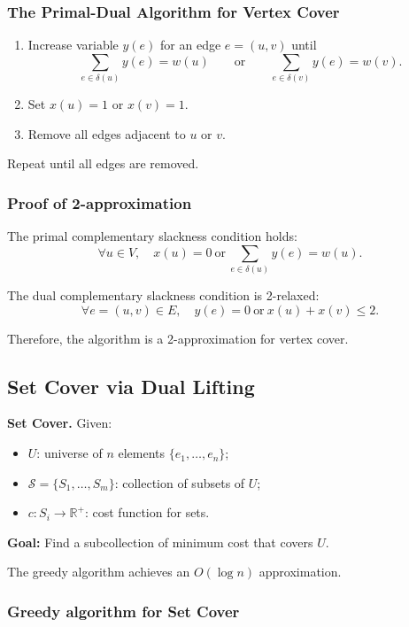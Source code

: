 \documentclass[12pt,a4paper]{report}
\begin{document}
\subsubsection{The Primal-Dual Algorithm for Vertex Cover}

\begin{enumerate}
\item Increase variable $y(e)$ for an edge $e=(u,v)$ until
\[
\sum_{e\in \delta(u)} y(e)=w(u)
\qquad \text{or} \qquad
\sum_{e\in \delta(v)} y(e)=w(v).
\]
\item Set $x(u)=1$ or $x(v)=1$.
\item Remove all edges adjacent to $u$ or $v$.
\end{enumerate}

Repeat until all edges are removed.

\subsubsection{Proof of 2-approximation}

The primal complementary slackness condition holds:
\[
\forall u\in V, \quad x(u)=0 \ \text{or} \ \sum_{e\in \delta(u)} y(e)=w(u).
\]

The dual complementary slackness condition is 2-relaxed:
\[
\forall e=(u,v)\in E, \quad y(e)=0 \ \text{or} \ x(u)+x(v)\le 2.
\]

Therefore, the algorithm is a 2-approximation for vertex cover.

\subsection{Set Cover via Dual Lifting}

\textbf{Set Cover.} Given:
\begin{itemize}
\item $U$: universe of $n$ elements $\{e_1,\dots,e_n\}$;
\item $\mathcal{S}=\{S_1,\dots,S_m\}$: collection of subsets of $U$;
\item $c:S_i\to \mathbb{R}^+$: cost function for sets.
\end{itemize}

\textbf{Goal:} Find a subcollection of minimum cost that covers $U$.

The greedy algorithm achieves an $O(\log n)$ approximation.

\subsubsection{Greedy algorithm for Set Cover}
\end{document}
